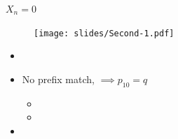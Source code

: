 \documentclass[xcolor=pdftex,dvipsnames,table]{beamer}
\begin{document}
\begin{frame}
\begin{block}{$X_n = 0$}
\begin{center}
    \begin{figure}%
        \texttt{[image: slides/Second-1.pdf]}
    \end{figure}
\end{center}
\end{block}

\begin{block}{}
   \begin{itemize}
            \item[] %
            \item No prefix match, $\implies p_{10} = q$ %
                 \begin{itemize}
                    \item[]%
                    \item[]
                 \end{itemize}
            \item[] %
    \end{itemize}
\end{block}
\end{frame}
\end{document}
